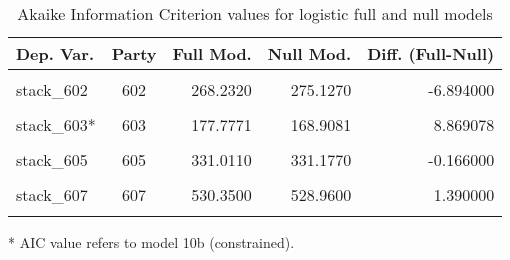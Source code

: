 \documentclass[
]{article}
\begin{document}
\begin{table}[!h]

\caption{\label{tab:unnamed-chunk-27}Akaike Information Criterion values for logistic full and null models 
        \label{table:logit_aic_cz}}
\centering
\begin{threeparttable}
\begin{tabular}[t]{lcrrr}
\toprule
Dep. Var. & Party & Full Mod. & Null Mod. & Diff. (Full-Null)\\
\midrule
\cellcolor{gray!6}{stack\_601} & \cellcolor{gray!6}{601} & \cellcolor{gray!6}{214.1510} & \cellcolor{gray!6}{255.3350} & \cellcolor{gray!6}{-41.184000}\\
stack\_602 & 602 & 268.2320 & 275.1270 & -6.894000\\
\cellcolor{gray!6}{stack\_603} & \cellcolor{gray!6}{603} & \cellcolor{gray!6}{177.7960} & \cellcolor{gray!6}{168.9080} & \cellcolor{gray!6}{8.888000}\\
stack\_603* & 603 & 177.7771 & 168.9081 & 8.869078\\
\cellcolor{gray!6}{stack\_604} & \cellcolor{gray!6}{604} & \cellcolor{gray!6}{473.8810} & \cellcolor{gray!6}{462.0590} & \cellcolor{gray!6}{11.822000}\\
\addlinespace
stack\_605 & 605 & 331.0110 & 331.1770 & -0.166000\\
\cellcolor{gray!6}{stack\_606} & \cellcolor{gray!6}{606} & \cellcolor{gray!6}{723.2760} & \cellcolor{gray!6}{774.4330} & \cellcolor{gray!6}{-51.157000}\\
stack\_607 & 607 & 530.3500 & 528.9600 & 1.390000\\
\cellcolor{gray!6}{stack\_608} & \cellcolor{gray!6}{608} & \cellcolor{gray!6}{395.1280} & \cellcolor{gray!6}{394.0820} & \cellcolor{gray!6}{1.046000}\\
\bottomrule
\end{tabular}
\begin{tablenotes}[para]
\item[*] AIC value refers to model 10b (constrained).
\end{tablenotes}
\end{threeparttable}
\end{table}
\end{document}
